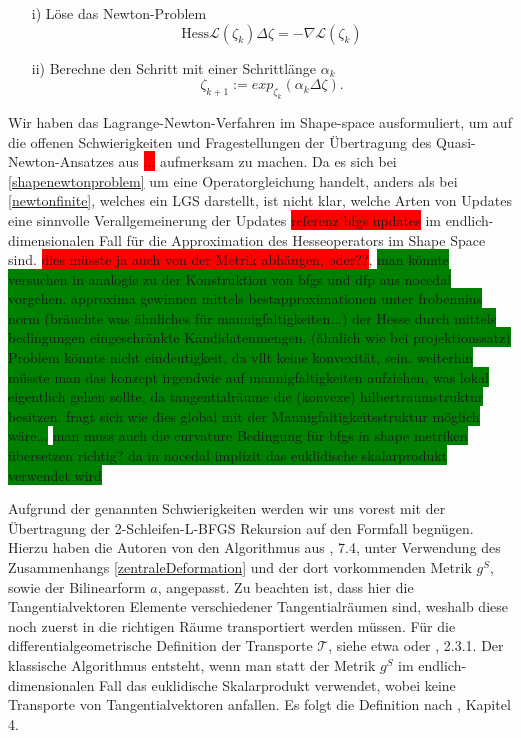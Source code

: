 \begin{itemize}
	\item[i)] Löse das Newton-Problem \\
	\begin{equation}\label{shapenewtonproblem}
	\text{Hess}\mathcal{L}(\zeta_k)\Delta \zeta = - \nabla \mathcal{L}(\zeta_k)
	\end{equation}
	\item[ii)] Berechne den Schritt mit einer Schrittlänge $\alpha_k$
	\begin{equation}
	\zeta_{k+1} := exp_{\zeta_k}(\alpha_k \Delta \zeta).
	\end{equation}
\end{itemize}
Wir haben das Lagrange-Newton-Verfahren im Shape-space ausformuliert, um auf die offenen Schwierigkeiten und Fragestellungen der Übertragung des Quasi-Newton-Ansatzes aus \colorbox{red}{...} aufmerksam zu machen. Da es sich bei 
\ref{shapenewtonproblem} um eine Operatorgleichung handelt, anders als bei \ref{newtonfinite}, welches ein LGS darstellt, ist nicht klar, welche Arten von Updates eine sinnvolle Verallgemeinerung der Updates \colorbox{red}{referenz bfgs updates} im endlich-dimensionalen Fall für die Approximation des Hesseoperators im Shape Space sind. \colorbox{red}{dies müsste ja auch von der Metrik abhängen, oder??},
\colorbox{green}{man könnte versuchen in analogie zu der Konstruktion von bfgs und dfp aus nocedal vorgehen. approxima gewinnen mittels bestapproximationen unter frobennius norm (bräuchte was ähnliches für mannigfaltigkeiten...) der Hesse durch mittels bedingungen eingeschränkte Kandidatenmengen. (ähnlich wie bei projektionssatz) Problem könnte nicht eindeutigkeit, da vllt keine konvexität, sein. weiterhin müsste man das konzept irgendwie auf mannigfaltigkeiten aufziehen, was lokal eigentlich gehen sollte, da tangentialräume die (konvexe) hilbertraumstruktur besitzen. fragt sich wie dies global mit der Mannigfaltigkeitsstruktur möglich wäre...}
\colorbox{green}{man muss auch die curvature Bedingung für bfgs in shape metriken übersetzen richtig? da in nocedal implizit das euklidische skalarprodukt verwendet wird}

Aufgrund der genannten Schwierigkeiten werden wir uns vorest mit der Übertragung der 2-Schleifen-L-BFGS Rekursion auf den Formfall begnügen. Hierzu haben die Autoren von \cite{bfgs1} den Algorithmus aus \cite{Nocedal}, 7.4, unter Verwendung des Zusammenhangs \ref{zentraleDeformation} und der dort vorkommenden Metrik $g^S$, sowie der Bilinearform $a$, angepasst. Zu beachten ist, dass hier die Tangentialvektoren Elemente verschiedener Tangentialräumen sind, weshalb diese noch zuerst in die richtigen Räume transportiert werden müssen. Für die differentialgeometrische Definition der Transporte $\mathcal{T}$, siehe etwa \cite{LeeDGEO} oder \cite{shape_space}, 2.3.1. Der klassische Algorithmus entsteht, wenn man statt der Metrik $g^S$ im endlich-dimensionalen Fall das euklidische Skalarprodukt verwendet, wobei keine Transporte von Tangentialvektoren anfallen. Es folgt die Definition nach \cite{bfgs1}, Kapitel 4.

